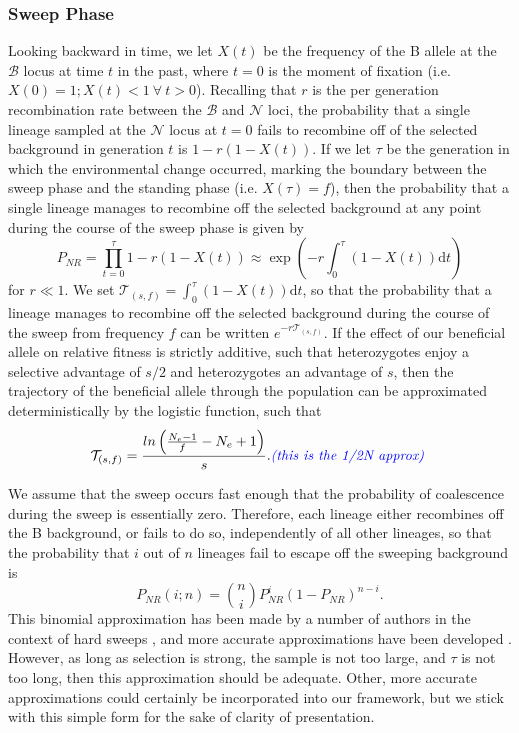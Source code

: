 \documentclass[a4paper,10pt]{article}
\newcommand{\fancyN}{$\mathcal N$ }
\newcommand{\fancyB}{$\mathcal B$ }
\newcommand{\jb}[1]{{\it\color{blue} (#1)} }
\begin{document}
\subsubsection{Sweep Phase}
Looking backward in time, we let $X\left(t\right)$ be the frequency of the B allele at the \fancyB locus at time $t$ in the past, where $t=0$ is the moment of fixation (i.e. $X\left(0\right) = 1; X\left(t\right) < 1\ \forall\ t > 0$). Recalling that $r$ is the per generation recombination rate between the \fancyB and \fancyN loci, the probability that a single lineage sampled at the \fancyN locus at $t=0$ fails to recombine off of the selected background in generation $t$ is $1-r\left(1-X(t)\right)$. If we let $\tau$ be the generation in which the environmental change occurred, marking the boundary between the sweep phase and the standing phase (i.e. $X\left(\tau\right) = f$), then the probability that a single lineage manages to recombine off the selected background at any point during the course of the sweep phase is given by
\begin{equation}
P_{NR} = \prod_{t=0}^{\tau} 1-r\left(1-X(t)\right)  \approx \exp \left(-r \int_0^{\tau}(1-X\left(t\right))\mathrm{d} t \right)
\end{equation}
for $r \ll 1$. We set  $\mathcal{T}_{\left(s,f\right)} = \int_0^{\tau}(1-X\left(t\right))\mathrm{d}t$, so that the probability that a lineage manages to recombine off the selected background during the course of the sweep from frequency $f$ can be written $e^{-r\mathcal{T}_{\left(s,f\right)}}$. If the effect of our beneficial allele on relative fitness is strictly additive, such that heterozygotes enjoy a selective advantage of $s/2$ and heterozygotes an advantage of $s$, then the trajectory of the beneficial allele through the population can be approximated deterministically by the logistic function, such that 
\begin{equation}
	\mathcal{T}_{\left(s,f\right)} = \frac{ln\left(\frac{N_e - 1}{f}-N_e + 1\right)}{s}. \textrm{\jb{this is the 1/2N approx}}
\end{equation}

We assume that the sweep occurs fast enough that the probability of coalescence during the sweep is essentially zero. Therefore, each lineage either recombines off the B background, or fails to do so, independently of all other lineages, so that the probability that $i$ out of $n$ lineages fail to escape off the sweeping background is
\begin{equation}
P_{NR}(i;n) = {n \choose i} P_{NR}^{i} (1-P_{NR})^{n-i}.
\end{equation}
This binomial approximation has been made by a number of authors in the context of hard sweeps \citep{Barton}, and more accurate approximations have been developed \citep{Etheridge2006}. However, as long as selection is strong, the sample is not too large,  and $\tau$ is not too long, then this approximation should be adequate. Other, more accurate approximations could certainly be incorporated into our framework, but we stick with this simple form for the sake of clarity of presentation.
\end{document}
